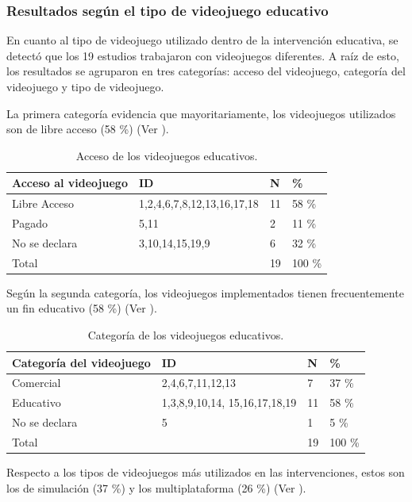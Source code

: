 \documentclass[spanish]{textolivre}
\begin{document}
\subsubsection{Resultados según el tipo de videojuego educativo}\label{sec-organizacao-latex}
En cuanto al tipo de videojuego utilizado dentro de la intervención educativa, se detectó que los 19 estudios trabajaron con videojuegos diferentes. A raíz de esto, los resultados se agruparon en tres categorías: acceso del videojuego, categoría del videojuego y tipo de videojuego.

La primera categoría evidencia que mayoritariamente, los videojuegos utilizados son de libre acceso (58 \%) (Ver ).

\begin{table}[htbp]
\caption{Acceso de los videojuegos educativos.}
\label{tbl5}
\centering
\begin{tabular}{l l l l}
\toprule 
\textbf{Acceso al videojuego} & \textbf{ID} & \textbf{N} & \textbf{\%}
\\
\midrule
Libre Acceso & 1,2,4,6,7,8,12,13,16,17,18 & 11 & 58 \%
\\
Pagado & 5,11 & 2 & 11 \%
\\
No se declara & 3,10,14,15,19,9 & 6 & 32 \%
\\
Total & & 19 & 100 \%
\\
\bottomrule
\end{tabular}
\end{table}

Según la segunda categoría, los videojuegos implementados tienen frecuentemente un fin educativo (58 \%) (Ver ).

\begin{table}[htbp]
\caption{Categoría de los videojuegos educativos.}
\label{tbl6}
\centering
\begin{tabular}{l l l l}
\toprule 
\textbf{Categoría del videojuego} & \textbf{ID} & \textbf{N} & \textbf{\%}
\\
\midrule
Comercial & 2,4,6,7,11,12,13 & 7 & 37 \%
\\
Educativo & 1,3,8,9,10,14, 15,16,17,18,19 & 11 & 58 \%
\\
No se declara & 5 & 1 & 5 \%
\\
Total & & 19 & 100 \%
\\
\bottomrule
\end{tabular}
\end{table}

Respecto a los tipos de videojuegos más utilizados en las intervenciones, estos son los de simulación (37 \%) y los multiplataforma (26 \%) (Ver ).
\end{document}
